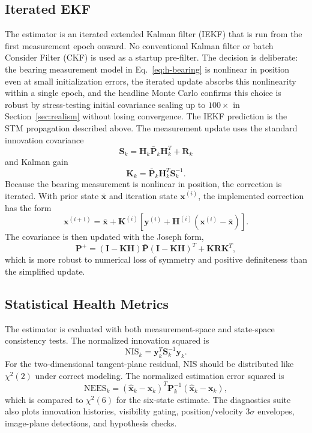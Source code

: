 \documentclass[10pt,twocolumn]{article}
\newcommand{\vect}[1]{\mathbf{#1}}
\newcommand{\mat}[1]{\mathbf{#1}}
\newcommand{\chisq}{\chi^2}
\begin{document}
\subsection{Iterated EKF}
The estimator is an iterated extended Kalman filter (IEKF) that is run from the first measurement epoch onward.  No conventional Kalman filter or batch Consider Filter (CKF) is used as a startup pre-filter.  The decision is deliberate: the bearing measurement model in Eq.~\eqref{eq:h-bearing} is nonlinear in position even at small initialization errors, the iterated update absorbs this nonlinearity within a single epoch, and the headline Monte Carlo confirms this choice is robust by stress-testing initial covariance scaling up to $100\times$ in Section~\ref{sec:realism} without losing convergence.  The IEKF prediction is the STM propagation described above.  The measurement update uses the standard innovation covariance
\[
\mat{S}_k=\mat{H}_k\bar{\vect{P}}_k\mat{H}_k^T+\mat{R}_k
\]
and Kalman gain
\[
\mat{K}_k=\bar{\vect{P}}_k\mat{H}_k^T\mat{S}_k^{-1}.
\]
Because the bearing measurement is nonlinear in position, the correction is iterated.  With prior state $\bar{\vect{x}}$ and iteration state $\vect{x}^{(i)}$, the implemented correction has the form
\begin{equation}
\vect{x}^{(i+1)}
=\bar{\vect{x}}
+\mat{K}^{(i)}
\left[
\vect{y}^{(i)}
+\mat{H}^{(i)}\left(\vect{x}^{(i)}-\bar{\vect{x}}\right)
\right].
\end{equation}
The covariance is then updated with the Joseph form,
\begin{equation}
\vect{P}^{+}=(\mat{I}-\mat{K}\mat{H})\bar{\vect{P}}
(\mat{I}-\mat{K}\mat{H})^T+\mat{K}\mat{R}\mat{K}^T,
\end{equation}
which is more robust to numerical loss of symmetry and positive definiteness than the simplified update.

\subsection{Statistical Health Metrics}
The estimator is evaluated with both measurement-space and state-space consistency tests.  The normalized innovation squared is
\begin{equation}
\mathrm{NIS}_k = \vect{y}_k^T\mat{S}_k^{-1}\vect{y}_k.
\end{equation}
For the two-dimensional tangent-plane residual, NIS should be distributed like $\chisq(2)$ under correct modeling.  The normalized estimation error squared is
\begin{equation}
\mathrm{NEES}_k=(\hat{\vect{x}}_k-\vect{x}_k)^T
\vect{P}_k^{-1}(\hat{\vect{x}}_k-\vect{x}_k),
\end{equation}
which is compared to $\chisq(6)$ for the six-state estimate.  The diagnostics suite also plots innovation histories, visibility gating, position/velocity $3\sigma$ envelopes, image-plane detections, and hypothesis checks.
\end{document}
